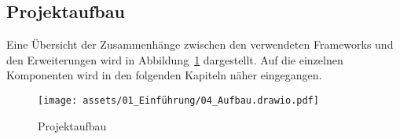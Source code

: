 \subsection{Projektaufbau}

Eine Übersicht der Zusammenhänge zwischen den verwendeten Frameworks und den Erweiterungen wird in Abbildung~\ref{asset:Projektaufbau} dargestellt.
Auf die einzelnen Komponenten wird in den folgenden Kapiteln näher eingegangen.

\begin{figure}[H]
  \centering
  \texttt{[image: assets/01\_Einführung/04\_Aufbau.drawio.pdf]}
  \caption{Projektaufbau}
  \label{asset:Projektaufbau}
\end{figure}
